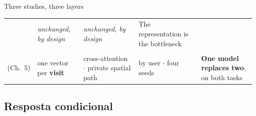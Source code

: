 \documentclass{beamer}
\begin{document}
\begin{frame}{Three studies, three layers}
{\begin{tabular}{@{}p{1.6cm} p{2.3cm} p{2.2cm} p{2.1cm} p{5.0cm}@{}}
            & {\scriptsize\color{black!70}\raggedright \textit{unchanged, by design}\par}
            & {\scriptsize\color{black!70}\raggedright \textit{unchanged, by design}\par}
            & {\large\raggedright \alert{The representation is the bottleneck}\par} \\
        \addlinespace
        {\scriptsize\raggedright \textbf{Check2HGI}\\(Ch.~5)\par}
            & {\scriptsize\color{black!70}\raggedright one vector per \textbf{visit}\par}
            & {\scriptsize\color{black!70}\raggedright cross-attention $\cdot$ private spatial path\par}
            & {\scriptsize\color{black!70}\raggedright by user $\cdot$ four seeds\par}
            & {\large\raggedright \textbf{One model replaces two}, on both tasks\par} \\
        \bottomrule
    \end{tabular}\par}
    \vfill
\end{frame}

\subsection{Resposta condicional}
\end{document}
